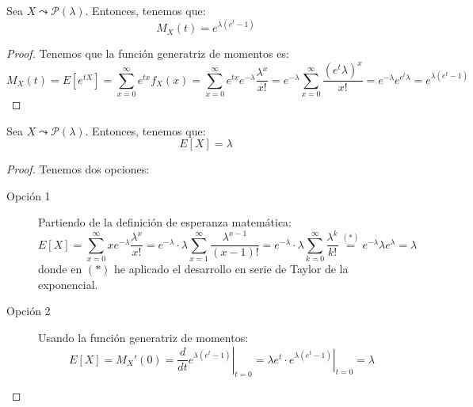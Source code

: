 \begin{prop}
    Sea $X\leadsto \mathcal{P}(\lambda)$. Entonces, tenemos que:
    \begin{equation*}
        M_X(t)= e^{\lambda(e^t-1)}
    \end{equation*}
\end{prop}
\begin{proof} Tenemos que la función generatriz de momentos es:
\begin{equation*}
    M_X(t)=E[e^{tX}] = \sum_{x=0}^\infty e^{tx}f_X(x) = \sum_{x=0}^\infty e^{tx}e^{-\lambda}\frac{\lambda^x}{x!}
    =e^{-\lambda}\sum_{x=0}^\infty \frac{(e^t\lambda)^x}{x!} = e^{-\lambda}e^{e^t\lambda} = e^{\lambda(e^t-1)}
\end{equation*}
\end{proof}


\begin{prop}
    Sea $X\leadsto \mathcal{P}(\lambda)$. Entonces, tenemos que:
    \begin{equation*}
        E[X]= \lambda
    \end{equation*}
\end{prop}
\begin{proof} 
    Tenemos dos opciones:
    \begin{description}
        \item[Opción 1]  Partiendo de la definición de esperanza matemática:
        \begin{equation*}
            E[X]=\sum_{x=0}^\infty xe^{-\lambda}\frac{\lambda^x}{x!}
            = e^{-\lambda}\cdot \lambda \sum_{x=1}^\infty \frac{\lambda^{x-1}}{(x-1)!}
            = e^{-\lambda}\cdot \lambda \sum_{k=0}^\infty \frac{\lambda^k}{k!}
            \stackrel{(\ast)}{=} e^{-\lambda}\lambda e^{\lambda}=\lambda
        \end{equation*}
        donde en $(\ast)$ he aplicado el desarrollo en serie de Taylor de la exponencial.

        \item[Opción 2] Usando la función generatriz de momentos:
        \begin{equation*}
            E[X]=M_X'(0)=\left. \frac{d}{dt} e^{\lambda(e^t-1)}\right|_{t=0} = \left. \lambda e^t \cdot e^{\lambda(e^t-1)}\right|_{t=0} = \lambda
        \end{equation*}
    \end{description}
\end{proof}


